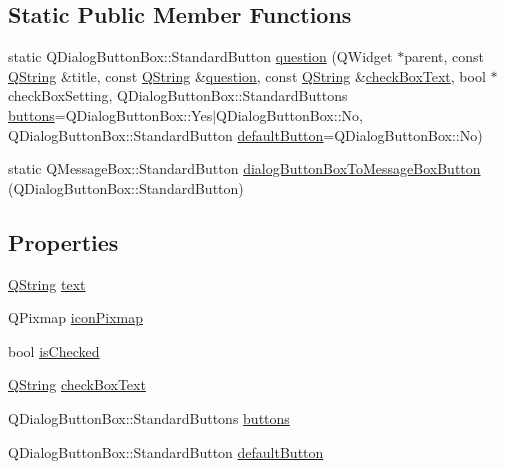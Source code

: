 \subsection*{\-Static \-Public \-Member \-Functions}
\begin{DoxyCompactItemize}
\item 
static \*
\-Q\-Dialog\-Button\-Box\-::\-Standard\-Button \hyperlink{class_utils_1_1_checkable_message_box_ab06a80f3d8dab0a2c5f5957dfe2409fc}{question} (\-Q\-Widget $\ast$parent, const \hyperlink{group___u_a_v_objects_plugin_gab9d252f49c333c94a72f97ce3105a32d}{\-Q\-String} \&title, const \hyperlink{group___u_a_v_objects_plugin_gab9d252f49c333c94a72f97ce3105a32d}{\-Q\-String} \&\hyperlink{class_utils_1_1_checkable_message_box_ab06a80f3d8dab0a2c5f5957dfe2409fc}{question}, const \hyperlink{group___u_a_v_objects_plugin_gab9d252f49c333c94a72f97ce3105a32d}{\-Q\-String} \&\hyperlink{class_utils_1_1_checkable_message_box_a47682e1634b9d1806e19abc75a3d13dc}{check\-Box\-Text}, bool $\ast$check\-Box\-Setting, \-Q\-Dialog\-Button\-Box\-::\-Standard\-Buttons \hyperlink{class_utils_1_1_checkable_message_box_a130bcf930f0446f5129b81504ce70e82}{buttons}=\-Q\-Dialog\-Button\-Box\-::\-Yes$|$\-Q\-Dialog\-Button\-Box\-::\-No, \-Q\-Dialog\-Button\-Box\-::\-Standard\-Button \hyperlink{class_utils_1_1_checkable_message_box_ab3ac6c8016a1f22d503293af7434db0f}{default\-Button}=\-Q\-Dialog\-Button\-Box\-::\-No)
\item 
static \-Q\-Message\-Box\-::\-Standard\-Button \hyperlink{class_utils_1_1_checkable_message_box_a0bb1ba3ba531e124dfb8d1b129755c47}{dialog\-Button\-Box\-To\-Message\-Box\-Button} (\-Q\-Dialog\-Button\-Box\-::\-Standard\-Button)
\end{DoxyCompactItemize}
\subsection*{\-Properties}
\begin{DoxyCompactItemize}
\item 
\hyperlink{group___u_a_v_objects_plugin_gab9d252f49c333c94a72f97ce3105a32d}{\-Q\-String} \hyperlink{class_utils_1_1_checkable_message_box_a2fa5240368beedd12fb217a593410aae}{text}
\item 
\-Q\-Pixmap \hyperlink{class_utils_1_1_checkable_message_box_aee6ca7e2633372c9938d00a307ff2dc7}{icon\-Pixmap}
\item 
bool \hyperlink{class_utils_1_1_checkable_message_box_a344ff6c020a0351070685083aba8c3ab}{is\-Checked}
\item 
\hyperlink{group___u_a_v_objects_plugin_gab9d252f49c333c94a72f97ce3105a32d}{\-Q\-String} \hyperlink{class_utils_1_1_checkable_message_box_a47682e1634b9d1806e19abc75a3d13dc}{check\-Box\-Text}
\item 
\-Q\-Dialog\-Button\-Box\-::\-Standard\-Buttons \hyperlink{class_utils_1_1_checkable_message_box_a130bcf930f0446f5129b81504ce70e82}{buttons}
\item 
\-Q\-Dialog\-Button\-Box\-::\-Standard\-Button \hyperlink{class_utils_1_1_checkable_message_box_ab3ac6c8016a1f22d503293af7434db0f}{default\-Button}
\end{DoxyCompactItemize}


